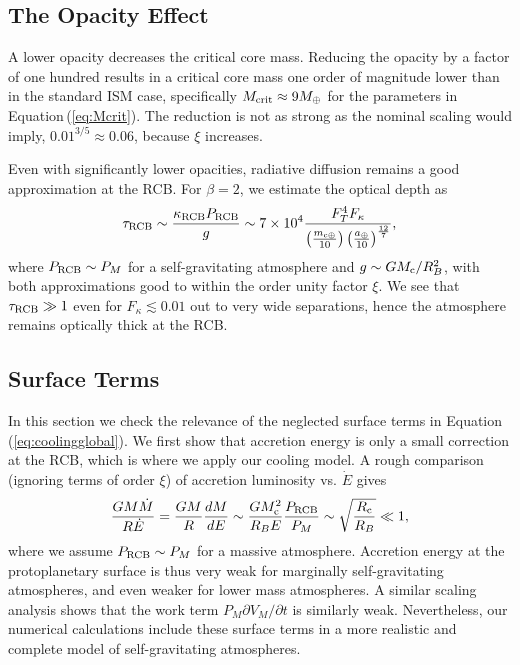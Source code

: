 \documentclass[apj, numberedappendix]{emulateapj}
\newcommand{\p}{\partial}
\newcommand{\Eq}[1]{Equation\,(\ref{#1})}
\newcommand{\co}{_{\rm c}}
\newcommand{\cb}{_{\rm RCB}}
\newcommand{\mc}{m_{\rm c \oplus}}
\newcommand{\au}{a_\oplus}
\begin{document}
\subsection{The Opacity Effect}
\label{opacityan}
A  lower opacity  decreases the critical core mass.  Reducing the opacity by a factor of one hundred results in a critical core mass one order of magnitude lower than in the standard ISM case, specifically  $M_{\rm{crit}} \approx9 M_\oplus$ for the parameters in \Eq{eq:Mcrit}.  The reduction is not  as strong as the nominal scaling would imply, $0.01^{3/5} \approx 0.06$, because $\xi$ increases.

Even with significantly lower opacities, radiative diffusion remains a good approximation at the RCB. For $\beta = 2$, we estimate the optical depth as
\begin{equation}
\tau\cb \sim {\kappa\cb P\cb \over g} \sim 7 \times 10^4 {F_T^4 F_\kappa \over \left(\mc \over 10 \right) \left(\au \over 10\right)^{12 \over 7}}, 
\end{equation} 
where $P\cb \sim P_M$ for a self-gravitating atmosphere and $g \sim G M\co/R_B^2$, with both approximations good to within the order unity factor $\xi$.  We see that $\tau\cb \gg 1$ even for $F_\kappa \lesssim 0.01$ out to very wide separations, hence the atmosphere remains optically thick at the RCB.


\subsection{Surface Terms}
\label{surfterms}
In this section we check the relevance of the neglected surface terms in \Eq{eq:coolingglobal}.  We first show that accretion energy is only a small correction at the RCB, which is where we apply our cooling model. A rough comparison (ignoring terms of order $\xi$) of  accretion luminosity vs. $\dot{E}$ gives
\begin{equation}
{G M \dot{M} \over R \dot{E}} = {G M  \over R}{dM \over dE} \sim {G M\co^2 \over R_B E}{P\cb \over P_M} \sim \sqrt{R\co \over R_B} \ll 1,
\end{equation} 
where we assume $P\cb \sim P_M$  for a massive atmosphere.  Accretion energy at the protoplanetary surface is thus very weak for marginally self-gravitating atmospheres, and even weaker for lower mass atmospheres.  A similar scaling analysis shows that the work term $P_M \p V_M/\p t$ is similarly weak.  Nevertheless, our numerical calculations include these surface terms in a more realistic and complete model of self-gravitating atmospheres.
\end{document}
